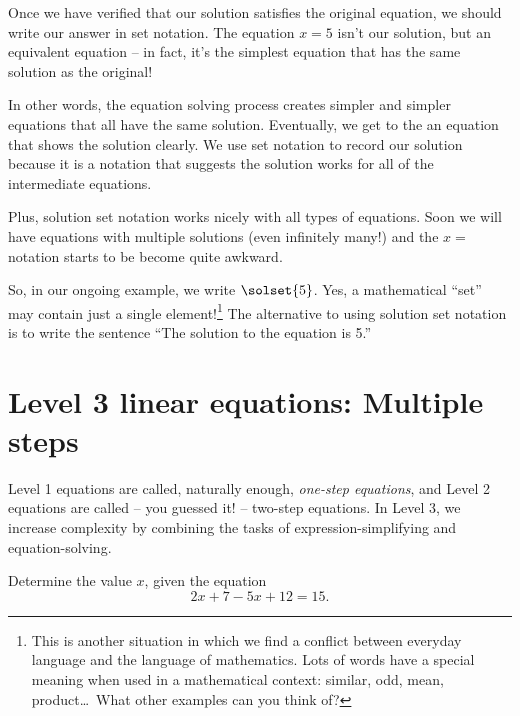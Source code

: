 Once we have verified that our solution satisfies the original equation, we should write our answer in set notation. The equation $x=5$ isn't our solution, but an equivalent equation -- in fact, it's the simplest equation that has the same solution as the original!

In other words, the equation solving process creates simpler and simpler equations that all have the same solution. Eventually, we get to the an equation that shows the solution clearly. We use set notation to record our solution because it is a notation that suggests the solution works for all of the intermediate equations.

Plus, solution set notation works nicely with all types of equations. Soon we will have equations with multiple solutions (even infinitely many!) and the $x=$ notation starts to be become quite awkward.

So, in our ongoing example, we write $\solset{5}$. Yes, a mathematical ``set'' may contain just a single element!\footnote{This is another situation in which we find a conflict between everyday language and the language of mathematics. Lots of words have a special meaning when used in a mathematical context: similar, odd, mean, product\ldots\ What other examples can you think of?} The alternative to using solution set notation is to write the sentence ``The solution to the equation is 5.''


\section{Level 3 linear equations: Multiple steps}
\label{sec:linearlevel3}

Level 1 equations are called, naturally enough, \textit{one-step equations}, and Level 2 equations are called -- you guessed it! -- two-step equations. In Level 3, we increase complexity by combining the tasks of expression-simplifying and equation-solving.


\begin{boxedexplore}
Determine the value $x$, given the equation \[2x + 7 - 5x + 12 = 15.\]
\end{boxedexplore} %

